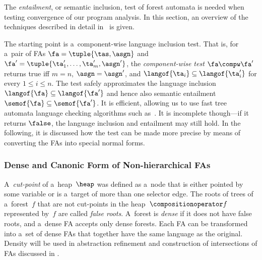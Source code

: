 The \emph{entailment}, or semantic inclusion, test of forest automata is needed when
testing convergence of our program analysis.
%
In this section, an overview of the techniques described in detail in~\cite{forester11,jiri:diza} is given. 
%

The starting point is a~component-wise language inclusion test.
That is, for a~pair of FAs ${\fa} = \tuple{\tas, \asgn}$ and ${\fa'} = \tuple{\ta_1',\ldots,\ta_m', \asgn'}$, 
the \emph{component-wise test}  $\fa\compw\fa'$ returns true iff $m=n$, $\asgn =
\asgn'$, and $\langof{\ta_i}\subseteq\langof{\ta_i'}$ for every $1 \leq i \leq
n$. The test safely approximates the language inclusion  $\langof{\fa}\subseteq\langof{\fa'}$
and hence also semantic entailment $\semof{\fa}\subseteq\semof{\fa'}$. 
It is
efficient, allowing us to use fast tree automata language checking
algorithms such as~\cite{tacas10}. It is incomplete though---if it returns
$\false$, the language inclusion and entailment may still hold.
%
In the following, it is discussed how the test can be made more precise by means of converting the FAs
into special normal forms.

\subsubsection*{Dense and Canonic Form of Non-hierarchical FAs}\label{sec:dense}
A~\emph{cut-point} of a~heap~$\heap$ was defined as a~node that is either pointed by some
variable or is a~target of more than one selector edge.
The roots of trees of a~forest~$f$ that are not cut-points in the
heap~$\compositionoperator f$ represented by~$f$ are called \emph{false roots}.
%
A~forest is \emph{dense} if it does not have false roots,
and a~dense FA accepts only dense forests. 
%
Each FA can be transformed into a~set of dense FAs that
together have the same language as the original.
%
Density will be used in abstraction refinement and construction of intersections of
FAs discussed in .

